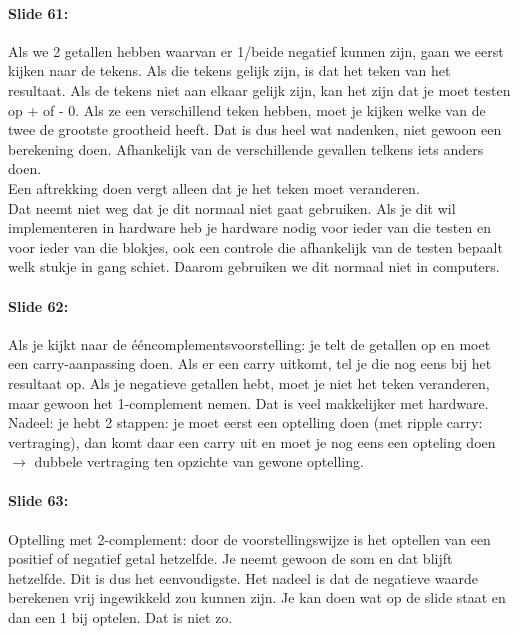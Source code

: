 \documentclass[10pt,a4paper]{book}
\begin{document}
\paragraph{Slide 61:} Als we 2 getallen hebben waarvan er 1/beide negatief kunnen zijn, gaan we eerst kijken naar de tekens. Als die tekens gelijk zijn, is dat het teken van het resultaat. Als de tekens niet aan elkaar gelijk zijn, kan het zijn dat je moet testen op + of - 0. Als ze een verschillend teken hebben, moet je kijken welke van de twee de grootste grootheid heeft. Dat is dus heel wat nadenken, niet gewoon een berekening doen. Afhankelijk van de verschillende gevallen telkens iets anders doen.\\
Een aftrekking doen vergt alleen dat je het teken moet veranderen.\\
Dat neemt niet weg dat je dit normaal niet gaat gebruiken. Als je dit wil implementeren in hardware heb je hardware nodig voor ieder van die testen en voor ieder van die blokjes, ook een controle die afhankelijk van de testen bepaalt welk stukje in gang schiet. Daarom gebruiken we dit normaal niet in computers.

\paragraph{Slide 62:} Als je kijkt naar de \'e\'encomplementsvoorstelling: je telt de getallen op en moet een carry-aanpassing doen. Als er een carry uitkomt, tel je die nog eens bij het resultaat op. Als je negatieve getallen hebt, moet je niet het teken veranderen, maar gewoon het 1-complement nemen. Dat is veel makkelijker met hardware.\\
Nadeel: je hebt 2 stappen: je moet eerst een optelling doen (met ripple carry: vertraging), dan komt daar een carry uit en moet je nog eens een opteling doen $\rightarrow$ dubbele vertraging ten opzichte van gewone optelling.

\paragraph{Slide 63:} Optelling met 2-complement: door de voorstellingswijze is het optellen van een positief of negatief getal hetzelfde. Je neemt gewoon de som en dat blijft hetzelfde. Dit is dus het eenvoudigste. Het nadeel is dat de negatieve waarde berekenen vrij ingewikkeld zou kunnen zijn. Je kan doen wat op de slide staat en dan een 1 bij optelen. Dat is niet zo.
\end{document}
